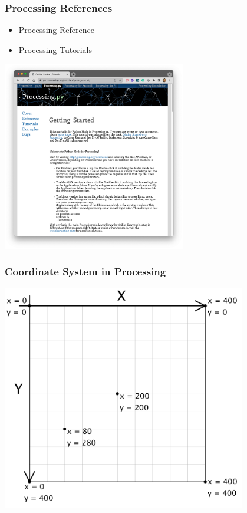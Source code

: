 \documentclass[10pt]{beamer}
\begin{document}
\begin{frame}
  \frametitle{Processing References}
   \begin{itemize}
   \item  \href{https://py.processing.org/reference/}{Processing Reference}
   \item  \href{https://py.processing.org/tutorials/}{Processing Tutorials}
   \end{itemize}
    \includegraphics[width=0.6\textwidth]{images/python06}
  \end{frame}
  

\begin{frame}
  \frametitle{Coordinate System in Processing}
   \includegraphics[width=0.8\textwidth]{images/koordinatsystem}

  \end{frame}
\end{document}
